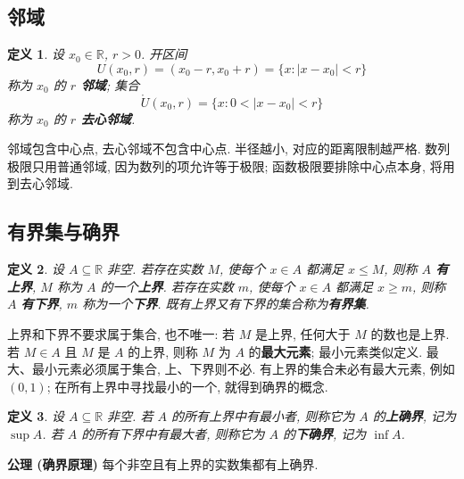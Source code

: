 \documentclass[UTF8,openany]{ctexbook}
\theoremstyle{chinesetextbook}
\newtheorem{definition}{定义}[section]
\begin{document}
\subsection{邻域}
\begin{definition}
设 $x_0\in\mathbb R$, $r>0$. 开区间
\[
U(x_0,r)=(x_0-r,x_0+r)=\{x:|x-x_0|<r\}
\]
称为 $x_0$ 的 \textbf{$r$ 邻域}; 集合
\[
\mathring U(x_0,r)=\{x:0<|x-x_0|<r\}
\]
称为 $x_0$ 的 \textbf{$r$ 去心邻域}.
\end{definition}
邻域包含中心点, 去心邻域不包含中心点. 半径越小, 对应的距离限制越严格. 数列极限只用普通邻域, 因为数列的项允许等于极限; 函数极限要排除中心点本身, 将用到去心邻域.
\subsection{有界集与确界}
\begin{definition}
设 $A\subseteq\mathbb R$ 非空. 若存在实数 $M$, 使每个 $x\in A$ 都满足 $x\le M$, 则称 $A$ \textbf{有上界}, $M$ 称为 $A$ 的一个\textbf{上界}. 若存在实数 $m$, 使每个 $x\in A$ 都满足 $x\ge m$, 则称 $A$ \textbf{有下界}, $m$ 称为一个\textbf{下界}. 既有上界又有下界的集合称为\textbf{有界集}.
\end{definition}
上界和下界不要求属于集合, 也不唯一: 若 $M$ 是上界, 任何大于 $M$ 的数也是上界. 若 $M\in A$ 且 $M$ 是 $A$ 的上界, 则称 $M$ 为 $A$ 的\textbf{最大元素}; 最小元素类似定义. 最大、最小元素必须属于集合, 上、下界则不必. 有上界的集合未必有最大元素, 例如 $(0,1)$; 在所有上界中寻找最小的一个, 就得到确界的概念.
\begin{definition}
设 $A\subseteq\mathbb R$ 非空. 若 $A$ 的所有上界中有最小者, 则称它为 $A$ 的\textbf{上确界}, 记为 $\sup A$. 若 $A$ 的所有下界中有最大者, 则称它为 $A$ 的\textbf{下确界}, 记为 $\inf A$.
\end{definition}
\par\indent\textbf{公理 (确界原理)} 每个非空且有上界的实数集都有上确界.
\end{document}
